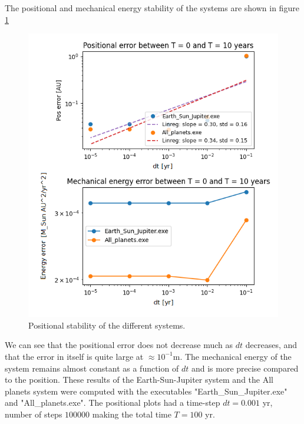 \documentclass[american,a4paper,12pt]{article}
\begin{document}
\newpage
The positional and mechanical energy stability of the systems are shown in figure \ref{fig:All_planets_stability}
\begin{figure}[H]
    \centering
    \includegraphics[width=\textwidth]{figures/All_planets_stability.png}
    \caption{Positional stability of the different systems.}
    \label{fig:All_planets_stability}
\end{figure}
We can see that the positional error does not decrease much as $dt$ decreases, and that the error in itself is quite large at $\approx 10^{-1}$m. The mechanical energy of the system remains almost constant as a function of $dt$ and is more precise compared to the position. These results of the Earth-Sun-Jupiter system and the All planets system were computed with the executables "Earth\_Sun\_Jupiter.exe" and "All\_planets.exe". The positional plots had a time-step $dt = 0.001$ yr, number of steps $100000$ making the total time $T = 100$ yr.

\newpage
\end{document}
